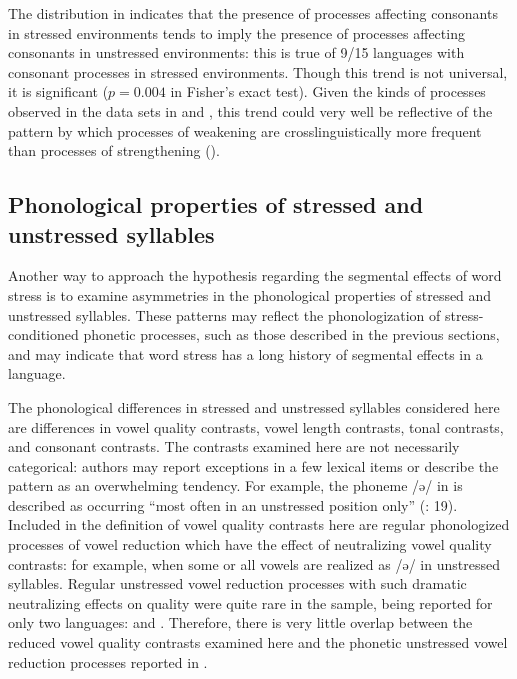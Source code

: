   The distribution in  indicates that the presence of processes affecting consonants in stressed environments tends to imply the presence of processes affecting consonants in unstressed environments: this is true of 9/15 languages with consonant processes in stressed environments. Though this trend is not universal, it is significant ($p = 0.004$ in Fisher’s exact test). Given the kinds of processes observed in the data sets in  and , this trend could very well be reflective of the pattern by which processes of weakening are crosslinguistically more frequent than processes of strengthening (\citealt{BybeeEasterday2019,Bybee2015b,Lavoie2015}).

\subsection{Phonological properties of stressed and unstressed syllables}\label{sec:5.4.4}

  Another way to approach the hypothesis regarding the segmental effects of word stress is to examine asymmetries in the phonological properties of stressed and unstressed syllables. These patterns may reflect the phonologization of stress-conditioned phonetic processes, such as those described in the previous sections, and may indicate that word stress has a long history of segmental effects in a language.

  The phonological differences in stressed and unstressed syllables considered here are differences in vowel quality contrasts, vowel length contrasts, tonal contrasts, and consonant contrasts. The contrasts examined here are not necessarily categorical: authors may report exceptions in a few lexical items or describe the pattern as an overwhelming tendency. For example, the phoneme /ə/ in  is described as occurring “most often in an unstressed position only” (\citealt{FranklinFranklin1978}: 19). Included in the definition of vowel quality contrasts here are regular phonologized processes of vowel reduction which have the effect of neutralizing vowel quality contrasts: for example, when some or all vowels are realized as /ə/ in unstressed syllables. Regular unstressed vowel reduction processes with such dramatic neutralizing effects on quality were quite rare in the sample, being reported for only two languages:  and . Therefore, there is very little overlap between the reduced vowel quality contrasts examined here and the phonetic unstressed vowel reduction processes reported in .

